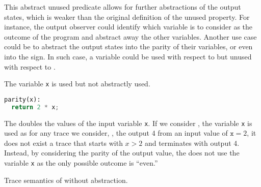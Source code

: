 This abstract unused predicate allows for further abstractions of the output states, which is weaker than the original definition of the unused property.
For instance, the output observer could identify which variable is to consider as the outcome of the program and abstract away the other variables. Another use case could be to abstract the output states into the parity of their variables, or even into the sign. In such case, a variable could be used with respect to  but unused with respect to .

  \begin{marginlisting}[*-2]
    \caption{The variable \texttt{x} is used but not abstractly used.}
    \vspace{15pt}
  \begin{lstlisting}[style=mystyle,language=Python]
parity(x):
  return 2 * x;
\end{lstlisting}
  \end{marginlisting}
  \begin{example}
  The  doubles the values of the input variable \texttt{x}. If we consider , the variable \texttt{x} is used as for any trace we consider, \eg, the output 4 from an input value of $\texttt{x}=2$, it does not exist a trace that starts with $x > 2$ and terminates with output 4. Instead, by considering the parity of the output value, the  does not use the variable \texttt{x} as the only possible outcome is ``even.''
\end{example}
  \begin{marginfigure}[*-6]
  \caption{Trace semantics of  without abstraction.}
  \end{marginfigure}
